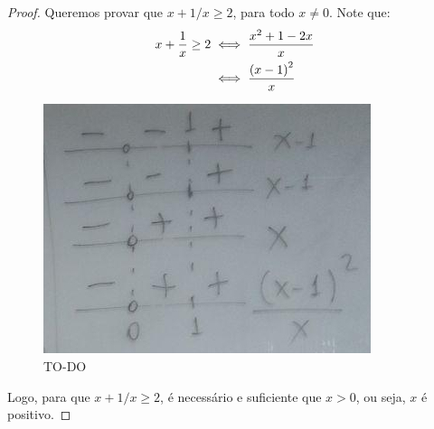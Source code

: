 \begin{proof}
Queremos provar que $x+1/x\ge 2$, para todo $x \ne 0$. Note que:
%
\begin{align*}
x+\dfrac{1}{x}\ge 2 &\iff \dfrac{x^2+1-2x}{x} \\
		&\iff \dfrac{\left(x-1\right)^2}{x}
\end{align*}

\begin{figure}[H]
\caption{TO-DO}
\includegraphics{quadros/03_equacoes_e_inequacoes/08-24/[ok]photo_2018-08-24_22-55-35(2).jpg}
\centering
\end{figure}

Logo, para que $x+1/x\ge 2$, é necessário e suficiente que $x > 0$, ou seja, $x$ é positivo.
\end{proof}